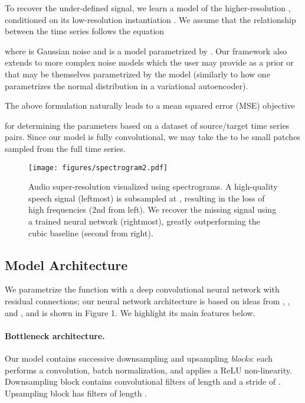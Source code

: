 \documentclass{article} \usepackage{iclr2017_workshop,times}
\begin{document}
To recover the under-defined signal, we learn a model  of the higher-resolution , conditioned on its low-resolution instantiation . 
We assume that the relationship between the time series  follows the equation

where  is Gaussian noise and  is a model parametrized by . Our framework also extends to more complex noise models which the user may provide as a prior or that may be themselves parametrized by the model (similarly to how one parametrizes the normal distribution in a variational autoencoder).

The above formulation naturally leads to a mean squared error (MSE) objective  

for determining the parameters  based on a dataset  of source/target time series pairs. Since our model is fully convolutional, we may take the  to be small patches sampled from the full time series.

\begin{figure}[t]
\begin{center}
\texttt{[image: figures/spectrogram2.pdf]}
\end{center}
\vspace{-5mm}
\caption{Audio super-resolution visualized using spectrograms. A high-quality speech signal (leftmost) is subsampled at , resulting in the loss of high frequencies (2nd from left). We recover the missing signal using a trained neural network (rightmost), greatly outperforming the cubic baseline (second from right). }
\end{figure}

\subsection{Model Architecture} 

We parametrize the function  with a deep convolutional neural network with residual connections; our neural network architecture is based on ideas from \citet{ShiCHTABRW16}, \citet{Dong:2016:ISU:2914182.2914303}, and \citet{pix2pix2016}, and is shown in Figure 1.
We highlight its main features below.




\paragraph{Bottleneck architecture.}

Our model contains  successive downsampling and upsampling {\em blocks}: each performs a convolution, batch normalization, and applies a ReLU non-linearity. Downsampling block  contains  convolutional filters of length  and a stride of . Upsampling block  has  filters of length .
\end{document}
